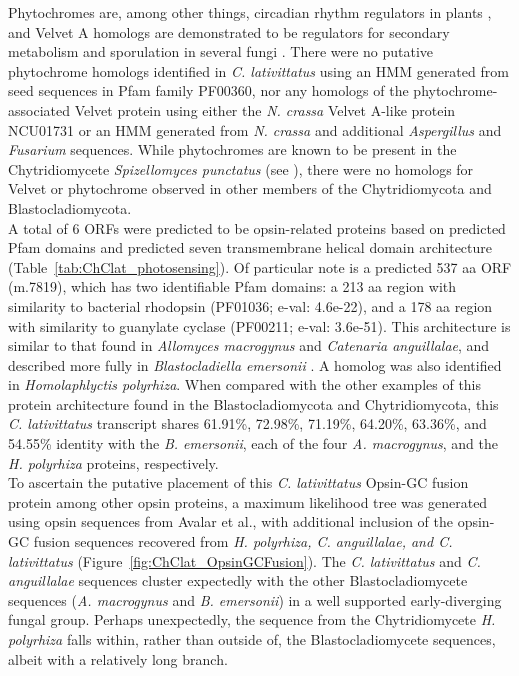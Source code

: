 \indent Phytochromes are, among other things, circadian rhythm regulators in plants \cite{Rockwell2006}, and Velvet A homologs are demonstrated to be regulators for secondary metabolism and sporulation in several fungi \cite{Calvo2008}. There were no putative phytochrome homologs identified in \textit{C. lativittatus} using an HMM generated from seed sequences in Pfam family PF00360, nor any homologs of the phytochrome-associated Velvet protein using either the \textit{N. crassa} Velvet A-like protein NCU01731 or an HMM generated from \textit{N. crassa} and additional \textit{Aspergillus} and \textit{Fusarium} sequences. While phytochromes are known to be present in the Chytridiomycete \textit{Spizellomyces punctatus} (see \cite{Idnurm2010}), there were no homologs for Velvet or phytochrome observed in other members of the Chytridiomycota and Blastocladiomycota. \\
\indent A total of 6 ORFs were predicted to be opsin-related proteins based on predicted Pfam domains and predicted seven transmembrane helical domain architecture (Table~\ref{tab:ChClat_photosensing}). Of particular note is a predicted 537 aa ORF (m.7819), which has two identifiable Pfam domains: a 213 aa region with similarity to bacterial rhodopsin (PF01036; e-val: 4.6e-22), and a 178 aa region with similarity to guanylate cyclase (PF00211; e-val: 3.6e-51). This architecture is similar to that found in \textit{Allomyces macrogynus} and \textit{Catenaria anguillalae}, and described more fully in \textit{Blastocladiella emersonii} \cite{Avelar2014}. A homolog was also identified in \textit{Homolaphlyctis polyrhiza}. When compared with the other examples of this protein architecture found in the Blastocladiomycota and Chytridiomycota, this \textit{C. lativittatus} transcript shares 61.91\%, 72.98\%, 71.19\%, 64.20\%, 63.36\%, and 54.55\% identity with the \textit{B. emersonii}, each of the four \textit{A. macrogynus}, and the \textit{H. polyrhiza} proteins, respectively.\\
\indent To ascertain the putative placement of this \textit{C. lativittatus} Opsin-GC fusion protein among other opsin proteins, a maximum likelihood tree was generated using opsin sequences from Avalar et al., with additional inclusion of the opsin-GC fusion sequences recovered from \textit{H. polyrhiza, C. anguillalae, and C. lativittatus} (Figure~\ref{fig:ChClat_OpsinGCFusion}). The \textit{C. lativittatus} and \textit{C. anguillalae} sequences cluster expectedly with the other Blastocladiomycete sequences (\textit{A. macrogynus} and \textit{B. emersonii}) in a well supported early-diverging fungal group. Perhaps unexpectedly, the sequence from the Chytridiomycete \textit{H. polyrhiza} falls within, rather than outside of, the Blastocladiomycete sequences, albeit with a relatively long branch.\\

